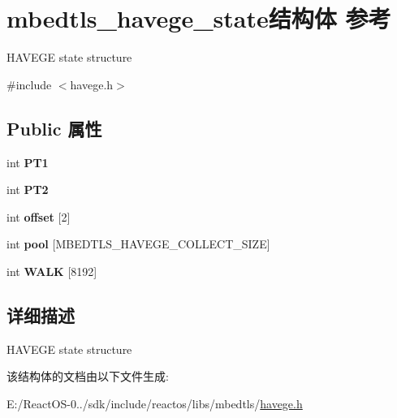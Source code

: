 \hypertarget{structmbedtls__havege__state}{}\section{mbedtls\+\_\+havege\+\_\+state结构体 参考}
\label{structmbedtls__havege__state}


H\+A\+V\+E\+GE state structure  




{\ttfamily \#include $<$havege.\+h$>$}

\subsection*{Public 属性}
\begin{DoxyCompactItemize}
\item 
\mbox{\label{structmbedtls__havege__state_adac07bcb4556e5831b0a1345fb4484ea}} 
int {\bfseries P\+T1}
\item 
\mbox{\label{structmbedtls__havege__state_ae0f660e103c23be2036ad0831052da2d}} 
int {\bfseries P\+T2}
\item 
\mbox{\label{structmbedtls__havege__state_a5e52d25e8ccf40df7069abdc5d8ac522}} 
int {\bfseries offset} \mbox{[}2\mbox{]}
\item 
\mbox{\label{structmbedtls__havege__state_a4abcd9c2f5e3dd42e264dfffdc2f17d9}} 
int {\bfseries pool} \mbox{[}M\+B\+E\+D\+T\+L\+S\+\_\+\+H\+A\+V\+E\+G\+E\+\_\+\+C\+O\+L\+L\+E\+C\+T\+\_\+\+S\+I\+ZE\mbox{]}
\item 
\mbox{\label{structmbedtls__havege__state_a14de6a4b46e53b88f36c82069042a99e}} 
int {\bfseries W\+A\+LK} \mbox{[}8192\mbox{]}
\end{DoxyCompactItemize}


\subsection{详细描述}
H\+A\+V\+E\+GE state structure 

该结构体的文档由以下文件生成\+:\begin{DoxyCompactItemize}
\item 
E\+:/\+React\+O\+S-\/0../sdk/include/reactos/libs/mbedtls/\hyperlink{havege_8h}{havege.\+h}\end{DoxyCompactItemize}
